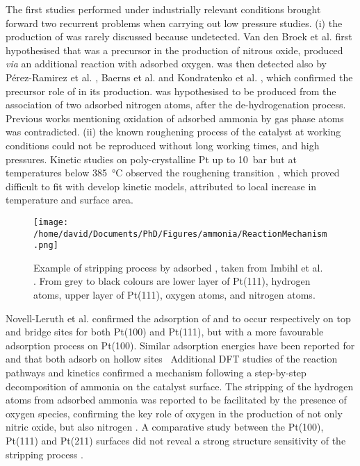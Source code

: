 The first studies performed under industrially relevant conditions brought forward two recurrent problems when carrying out low pressure studies.
(i) the production of  was rarely discussed because undetected.
Van den Broek et al. \parencite*{vandenBroek1999} first hypothesised that  was a precursor in the production of nitrous oxide, produced \textit{via} an additional reaction with adsorbed oxygen.
 was then detected also by Pérez-Ramirez et al. \parencite*{PerezRamirez2004}, Baerns et al. \parencite*{Baerns2005} and Kondratenko et al. \parencite*{Kondratenko2007}, which confirmed the precursor role of  in its production.
 was hypothesised to be produced from the association of two adsorbed nitrogen atoms, after the de-hydrogenation process.
Previous works mentioning oxidation of adsorbed ammonia by gas phase atoms was contradicted.
(ii) the known roughening process of the catalyst at working conditions could not be reproduced without long working times, and high pressures.
Kinetic studies on poly-crystalline Pt up to \qty{10}{\bar} but at temperatures below \qty{385}{\degreeCelsius} observed the roughening transition \parencite{Kraehnert2008}, which proved difficult to fit with develop kinetic models, attributed to local increase in temperature and surface area.

\begin{figure}[!htb]
    \centering
    \texttt{[image: /home/david/Documents/PhD/Figures/ammonia/ReactionMechanism.png]}
    \caption{
    Example of  stripping process by adsorbed , taken from Imbihl et al. \parencite*{Imbihl2007}.
    From grey to black colours are lower layer of Pt(111), hydrogen atoms, upper layer of Pt(111), oxygen atoms, and nitrogen atoms.
    }
    \label{fig:ReactionMechanism}
\end{figure}

Novell-Leruth et al. \parencite*{NovellLeruth2005} confirmed the adsorption of  and  to occur respectively on top and bridge sites for both Pt(100) and Pt(111), but with a more favourable adsorption process on Pt(100).
Similar adsorption energies have been reported for  and  that both adsorb on hollow sites \
Additional DFT studies of the reaction pathways and kinetics confirmed a mechanism following a step-by-step decomposition of ammonia on the catalyst surface.
The stripping of the hydrogen atoms from adsorbed ammonia was reported to be facilitated by the presence of oxygen species, confirming the key role of oxygen in the production of not only nitric oxide, but also nitrogen \parencite{Offermans2006}.
A comparative study between the Pt(100), Pt(111) and Pt(211) surfaces did not reveal a strong structure sensitivity of the \ce{NH_3} stripping process \parencite{Offermans2007}.

